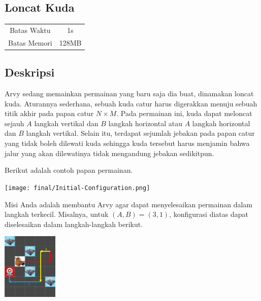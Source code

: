 \documentclass{article}
\begin{document}
\begin{center}
    \section*{Loncat Kuda} %

    \begin{tabular}{ | c c | }
        \hline
        Batas Waktu  & 1s \\    %
        Batas Memori & 128MB \\  %
        \hline
    \end{tabular}
\end{center}

\subsection*{Deskripsi}

Arvy sedang memainkan permainan yang baru saja dia buat, dinamakan loncat kuda. 
Aturannya sederhana, sebuah kuda catur harus digerakkan menuju sebuah titik akhir pada papan catur $N \times M$.
Pada permainan ini, kuda dapat meloncat sejauh $A$ langkah vertikal dan $B$ langkah horizontal atau $A$ langkah horizontal dan $B$ langkah vertikal.
Selain itu, terdapat sejumlah jebakan pada papan catur yang tidak boleh dilewati kuda sehingga kuda tersebut harus menjamin bahwa jalur yang akan dilewatinya tidak mengandung jebakan sedikitpun.

Berikut adalah contoh papan permainan.

\begin{center}
    \texttt{[image: final/Initial-Configuration.png]}    
\end{center}


Misi Anda adalah membantu Arvy agar dapat menyelesaikan permainan dalam langkah terkecil.
Misalnya, untuk $(A,B)=(3,1)$, konfigurasi diatas dapat diselesaikan dalam langkah-langkah berikut.

\begin{center}
    \includegraphics[width=100px]{Movelist}
\end{center}
\end{document}
